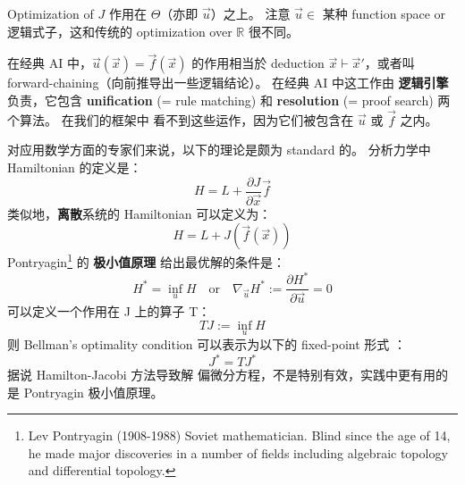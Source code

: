 \documentclass[12pt, orivec]{article}
\begin{document}
Optimization of $J$ 作用在 $\Theta$（亦即 $\vec{u}$）之上。  注意 $\vec{u} \in$ 某种 function space or 逻辑式子，这和传统的 optimization over $\mathbb{R}$ 很不同。 

\footnotesize
在经典 AI 中，$\vec{u}(\vec{x}) = \vec{f}(\vec{x})$ 的作用相当於 deduction $\vec{x} \vdash \vec{x}'$，或者叫 forward-chaining（向前推导出一些逻辑结论）。  在经典 AI 中这工作由 \textbf{逻辑引擎} 负责，它包含 \textbf{unification} (= rule matching) 和 \textbf{resolution} (= proof search) 两个算法。  在我们的框架中 看不到这些运作，因为它们被包含在 $\vec{u}$ 或 $\vec{f}$ 之内。 
\normalsize


对应用数学方面的专家们来说，以下的理论是颇为 standard 的。  分析力学中 Hamiltonian 的定义是：
\begin{equation}
H = L + \frac{\partial J}{\partial \vec{x}} \vec{f}
\end{equation}
类似地，\textbf{离散}系统的 Hamiltonian 可以定义为：
\begin{equation}
H = L + J ( \vec{f}(\vec{x}) )
\end{equation}
Pontryagin\footnote{Lev Pontryagin (1908-1988) Soviet mathematician. Blind since the age of 14, he made major discoveries in a number of fields including algebraic topology and differential topology.} 的 \textbf{极小值原理} 给出最优解的条件是：
\begin{equation}
\label{Pontryagin-max-principle}
H^* = \inf_u H \quad \mbox{or} \quad \nabla_{\vec{u}} H^* := \frac{\partial H^*}{\partial \vec{u}} = 0
\end{equation}
可以定义一个作用在 J 上的算子 T：
\begin{equation}
T J := \inf_u H
\end{equation}
则 Bellman's optimality condition 可以表示为以下的 fixed-point 形式 \parencite{Bertsekas2013}：
\begin{equation}
J^* = T J^*
\end{equation}
据说 Hamilton-Jacobi 方法导致解 偏微分方程，不是特别有效，实践中更有用的是 Pontryagin 极小值原理。
\end{document}
